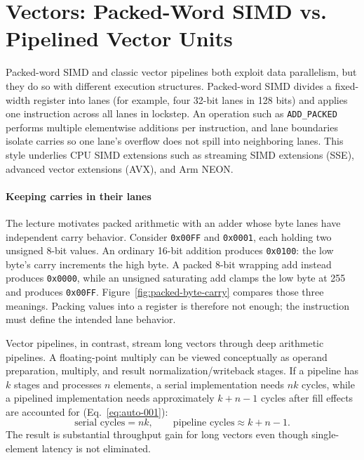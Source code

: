 \section{Vectors: Packed-Word SIMD vs. Pipelined Vector Units}\label{sec:auto-007}
Packed-word SIMD and classic vector pipelines both exploit data parallelism, but they do so with different execution structures.
Packed-word SIMD divides a fixed-width register into lanes (for example, four 32-bit lanes in 128 bits) and applies one instruction across all lanes in lockstep.
An operation such as \texttt{ADD\_PACKED} performs multiple elementwise additions per instruction, and lane boundaries isolate carries so one lane's overflow does not spill into neighboring lanes.
This style underlies CPU SIMD extensions such as streaming SIMD extensions (SSE), advanced vector extensions (AVX), and Arm NEON\@.

\paragraph{Keeping carries in their lanes}
The lecture motivates packed arithmetic with an adder whose byte lanes have independent carry behavior.
Consider \texttt{0x00FF} and \texttt{0x0001}, each holding two unsigned 8-bit values.
An ordinary 16-bit addition produces \texttt{0x0100}: the low byte's carry increments the high byte.
A packed 8-bit wrapping add instead produces \texttt{0x0000}, while an unsigned saturating add clamps the low byte at 255 and produces \texttt{0x00FF}.
Figure~\ref{fig:packed-byte-carry} compares those three meanings.
Packing values into a register is therefore not enough; the instruction must define the intended lane behavior.



Vector pipelines, in contrast, stream long vectors through deep arithmetic pipelines.
A floating-point multiply can be viewed conceptually as operand preparation, multiply, and result normalization/writeback stages.
If a pipeline has $k$ stages and processes $n$ elements, a serial implementation needs $nk$ cycles, while a pipelined implementation needs approximately $k+n-1$ cycles after fill effects are accounted for (Eq.~\eqref{eq:auto-001}):
\begin{equation}\label{eq:auto-001}
    \text{serial cycles} = nk,\qquad
    \text{pipeline cycles} \approx k+n-1.
\end{equation}
The result is substantial throughput gain for long vectors even though single-element latency is not eliminated.

